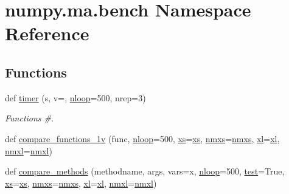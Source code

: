 \hypertarget{namespacenumpy_1_1ma_1_1bench}{}\section{numpy.\+ma.\+bench Namespace Reference}
\label{namespacenumpy_1_1ma_1_1bench}
\subsection*{Functions}
\begin{DoxyCompactItemize}
\item 
def \hyperlink{namespacenumpy_1_1ma_1_1bench_a774e2f21255c97dd4f461526ac75e9aa}{timer} (s, v=\textquotesingle{}\textquotesingle{}, \hyperlink{namespacenumpy_1_1ma_1_1bench_af7a867224403545e05051da6073c5e05}{nloop}=500, nrep=3)
\begin{DoxyCompactList}\small\item\em Functions \#. \end{DoxyCompactList}\item 
def \hyperlink{namespacenumpy_1_1ma_1_1bench_a3ab34b236186717774a6b480a6395b37}{compare\+\_\+functions\+\_\+1v} (func, \hyperlink{namespacenumpy_1_1ma_1_1bench_af7a867224403545e05051da6073c5e05}{nloop}=500, \hyperlink{namespacenumpy_1_1ma_1_1bench_abbf981f32817a2dc4ec6406bf324035a}{xs}=\hyperlink{namespacenumpy_1_1ma_1_1bench_abbf981f32817a2dc4ec6406bf324035a}{xs}, \hyperlink{namespacenumpy_1_1ma_1_1bench_ade94ef9dc31fe069bf5d359e7280e523}{nmxs}=\hyperlink{namespacenumpy_1_1ma_1_1bench_ade94ef9dc31fe069bf5d359e7280e523}{nmxs}, \hyperlink{namespacenumpy_1_1ma_1_1bench_aa633d91568b1f05d8931d11d0732e618}{xl}=\hyperlink{namespacenumpy_1_1ma_1_1bench_aa633d91568b1f05d8931d11d0732e618}{xl}, \hyperlink{namespacenumpy_1_1ma_1_1bench_a8fcb5f226ee57f4211051c4f3103d7e7}{nmxl}=\hyperlink{namespacenumpy_1_1ma_1_1bench_a8fcb5f226ee57f4211051c4f3103d7e7}{nmxl})
\item 
def \hyperlink{namespacenumpy_1_1ma_1_1bench_aab75d79acb6c71cd3b3c63af8bf31946}{compare\+\_\+methods} (methodname, args, vars=\textquotesingle{}x\textquotesingle{}, \hyperlink{namespacenumpy_1_1ma_1_1bench_af7a867224403545e05051da6073c5e05}{nloop}=500, \hyperlink{namespacenumpy_1_1ma_1_1bench_add079dcba3ec6892ce141568ede6ced5}{test}=True, \hyperlink{namespacenumpy_1_1ma_1_1bench_abbf981f32817a2dc4ec6406bf324035a}{xs}=\hyperlink{namespacenumpy_1_1ma_1_1bench_abbf981f32817a2dc4ec6406bf324035a}{xs}, \hyperlink{namespacenumpy_1_1ma_1_1bench_ade94ef9dc31fe069bf5d359e7280e523}{nmxs}=\hyperlink{namespacenumpy_1_1ma_1_1bench_ade94ef9dc31fe069bf5d359e7280e523}{nmxs}, \hyperlink{namespacenumpy_1_1ma_1_1bench_aa633d91568b1f05d8931d11d0732e618}{xl}=\hyperlink{namespacenumpy_1_1ma_1_1bench_aa633d91568b1f05d8931d11d0732e618}{xl}, \hyperlink{namespacenumpy_1_1ma_1_1bench_a8fcb5f226ee57f4211051c4f3103d7e7}{nmxl}=\hyperlink{namespacenumpy_1_1ma_1_1bench_a8fcb5f226ee57f4211051c4f3103d7e7}{nmxl})

\end{DoxyCompactItemize}
